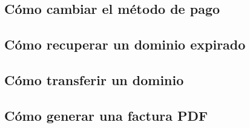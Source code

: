 \subsection{Cómo cambiar el método de pago}

\subsection{Cómo recuperar un dominio expirado}

\subsection{Cómo transferir un dominio}

\subsection{Cómo generar una factura PDF}
